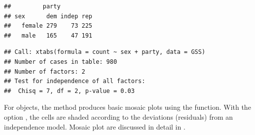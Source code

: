 \documentclass[11pt]{book}
\renewenvironment{knitrout}{\small\renewcommand{\baselinestretch}{.85}}{} %
\begin{document}
\begin{knitrout}
\color{fgcolor}\begin{kframe}
\begin{alltt}
 \hlkwb{<-}  \hlopt{~}  \hlopt{+}  
\end{alltt}
\begin{verbatim}
##         party
## sex      dem indep rep
##   female 279    73 225
##   male   165    47 191
\end{verbatim}
\begin{alltt}
\end{alltt}
\begin{verbatim}
## Call: xtabs(formula = count ~ sex + party, data = GSS)
## Number of cases in table: 980 
## Number of factors: 2 
## Test for independence of all factors:
## 	Chisq = 7, df = 2, p-value = 0.03
\end{verbatim}
\end{kframe}
\end{knitrout}
For  objects, the  method produces basic mosaic plots
using the  function. With the option , the
cells are shaded according to the deviations (residuals) from an independence model.
Mosaic plot are discussed in detail in .
\end{document}
